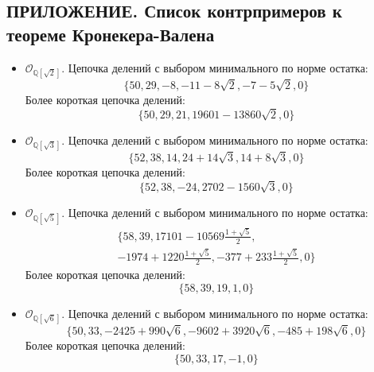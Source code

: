 \documentclass[_00_dissertation.tex]{subfiles}
\begin{document}
\onlyinsubfile{
    \renewcommand{\contentsname}{ОГЛАВЛЕНИЕ}
    \setcounter{tocdepth}{3}
    \tableofcontents
}

\begin{center}
    \chapter*{ПРИЛОЖЕНИЕ. Список контрпримеров к теореме Кронекера-Валена}\label{section:Appendix_counterexample}
\end{center}

\begin{itemize}
    \item $\mathcal{O}_{\mathbb{Q}[\sqrt{2}]}$.
    Цепочка делений с выбором минимального по норме остатка:
    \begin{equation*}
        \{50, 29, -8, -11-8\sqrt{2}, -7-5\sqrt{2}, 0\}
    \end{equation*}
    Более короткая цепочка делений:
    \begin{equation*}
        \{50, 29, 21, 19601-13860\sqrt{2}, 0\}
    \end{equation*}

    \item $\mathcal{O}_{\mathbb{Q}[\sqrt{3}]}$.
    Цепочка делений с выбором минимального по норме остатка:
    \begin{equation*}
        \{52, 38, 14, 24+14\sqrt{3}, 14+8\sqrt{3}, 0\}
    \end{equation*}
    Более короткая цепочка делений:
    \begin{equation*}
        \{52, 38, -24, 2702-1560\sqrt{3}, 0\}
    \end{equation*}

    \item $\mathcal{O}_{\mathbb{Q}[\sqrt{5}]}$.
    Цепочка делений с выбором минимального по норме остатка:
    \begin{multline*}
        \{58, 39, 17101-10569\frac{1+\sqrt{5}}{2},\\
        -1974+1220\frac{1+\sqrt{5}}{2}, -377+233\frac{1+\sqrt{5}}{2}, 0\}
    \end{multline*}
    Более короткая цепочка делений:
    \begin{equation*}
        \{58, 39, 19, 1, 0\}
    \end{equation*}

    \item $\mathcal{O}_{\mathbb{Q}[\sqrt{6}]}$.
    Цепочка делений с выбором минимального по норме остатка:
    \begin{equation*}
        \{50, 33, -2425+990\sqrt{6}, -9602+3920\sqrt{6}, -485+198\sqrt{6}, 0\}
    \end{equation*}
    Более короткая цепочка делений:
    \begin{equation*}
        \{50, 33, 17, -1, 0\}
    \end{equation*}


\end{itemize}
\end{document}
